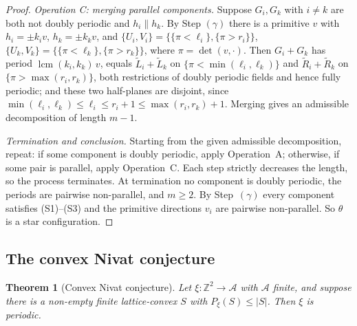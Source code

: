 \documentclass[11pt,reqno]{amsart}
\theoremstyle{plain}
\newtheorem{thm}{Theorem}[section]
\theoremstyle{definition}
\theoremstyle{remark}
\theoremstyle{plain}
\theoremstyle{remark}
\theoremstyle{definition}
\numberwithin{equation}{section}
\DeclareMathOperator{\lcm}{lcm}
\newcommand{\Z}{\mathbb{Z}}
\newcommand{\cA}{\mathcal{A}}
\begin{document}
\begin{proof}
\emph{Operation C: merging parallel components.}  Suppose $G_i,G_k$ with $i\ne
k$ are both not doubly periodic and $h_i\parallel h_k$.  By Step $(\gamma)$
there is a primitive $v$ with $h_i=\pm k_iv$, $h_k=\pm k_kv$, and
$\{U_i,V_i\}=\bigl\{\{\pi<\ell_i\},\{\pi>r_i\}\bigr\}$,
$\{U_k,V_k\}=\bigl\{\{\pi<\ell_k\},\{\pi>r_k\}\bigr\}$, where
$\pi=\det(v,\cdot)$.  Then $G_i+G_k$ has period $\lcm(k_i,k_k)\,v$, equals
$\widetilde L_i+\widetilde L_k$ on $\{\pi<\min(\ell_i,\ell_k)\}$ and
$\widetilde R_i+\widetilde R_k$ on $\{\pi>\max(r_i,r_k)\}$, both restrictions of
doubly periodic fields and hence fully periodic; and these two half-planes are
disjoint, since
$\min(\ell_i,\ell_k)\le\ell_i\le r_i+1\le\max(r_i,r_k)+1$.  Merging gives an
admissible decomposition of length $m-1$.

\emph{Termination and conclusion.}  Starting from the given admissible
decomposition, repeat: if some component is doubly periodic, apply Operation~A;
otherwise, if some pair is parallel, apply Operation~C.  Each step strictly
decreases the length, so the process terminates.  At termination no component is
doubly periodic, the periods are pairwise non-parallel, and $m\ge2$.  By
Step~$(\gamma)$ every component satisfies \textup{(S1)}--\textup{(S3)} and the
primitive directions $v_i$ are pairwise non-parallel.  So $\theta$ is a star
configuration.
\end{proof}

\subsection{The convex Nivat conjecture}\label{ssec:nivat}

\begin{thm}[Convex Nivat conjecture]\label{thm:convex-nivat}
Let $\xi\colon\Z^2\to\cA$ with $\cA$ finite, and suppose there is a non-empty
finite lattice-convex $S$ with $P_\xi(S)\le|S|$.  Then $\xi$ is periodic.
\end{thm}
\end{document}
